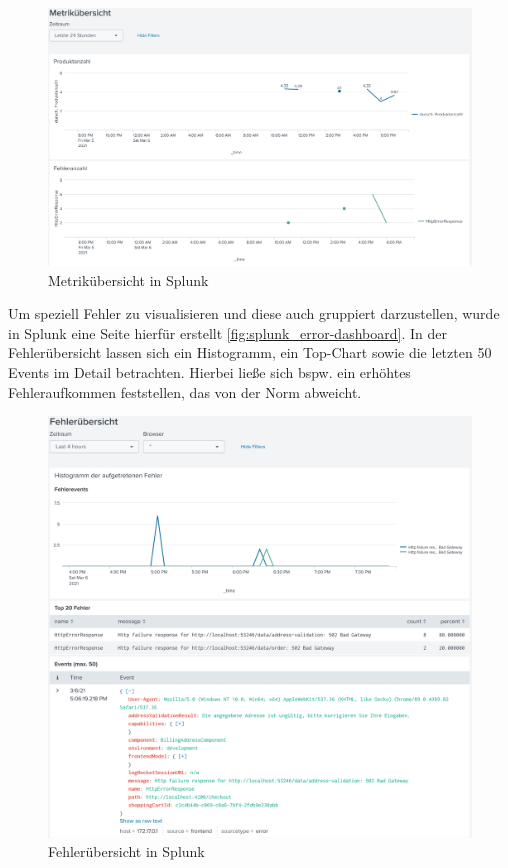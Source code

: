 \begin{figure}[H]
	\centering
	\includegraphics[width=1.00\linewidth]{img/99_postscript/splunk_metric-overview.png}
	\caption{Metrikübersicht in Splunk}
	\label{fig:splunk_metric-overview}
\end{figure}

Um speziell Fehler zu visualisieren und diese auch gruppiert darzustellen, wurde in Splunk eine Seite hierfür erstellt \autoref{fig:splunk_error-dashboard}. In der Fehlerübersicht lassen sich ein Histogramm, ein Top-Chart sowie die letzten 50 Events im Detail betrachten. Hierbei ließe sich bspw. ein erhöhtes Fehleraufkommen feststellen, das von der Norm abweicht.

\begin{figure}[H]
	\centering
	\includegraphics[width=1.00\linewidth]{img/99_postscript/splunk_error-dashboard.png}
	\caption{Fehlerübersicht in Splunk}
	\label{fig:splunk_error-dashboard}
\end{figure}

